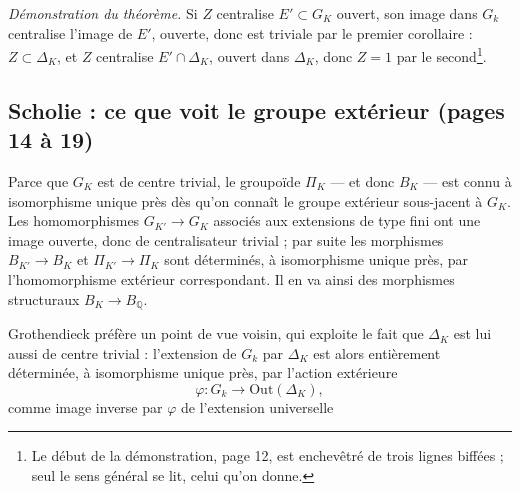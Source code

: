 \documentclass[11pt,a4paper]{article}
\begin{document}
\emph{Démonstration du théorème.} Si $Z$ centralise $E' \subset G_K$ ouvert,
son image dans $G_k$ centralise l'image de $E'$, ouverte, donc est triviale
par le premier corollaire : $Z \subset \Delta_K$, et $Z$ centralise $E' \cap
\Delta_K$, ouvert dans $\Delta_K$, donc $Z = 1$ par le second\footnote{Le
début de la démonstration, page 12, est enchevêtré de trois lignes biffées ;
seul le sens général se lit, celui qu'on donne.}.

\subsection*{Scholie : ce que voit le groupe extérieur (pages 14 à 19)}

Parce que $G_K$ est de centre trivial, le groupoïde $\Pi_K$ — et donc
$B_K$ — est connu à isomorphisme unique près dès qu'on connaît le groupe
extérieur sous-jacent à $G_K$. Les homomorphismes $G_{K'} \to G_K$ associés
aux extensions de type fini ont une image ouverte, donc de centralisateur
trivial ; par suite les morphismes $B_{K'} \to B_K$ et $\Pi_{K'} \to \Pi_K$
sont déterminés, à isomorphisme unique près, par l'homomorphisme extérieur
correspondant. Il en va ainsi des morphismes structuraux $B_K \to
B_{\mathbb{Q}}$.

Grothendieck préfère un point de vue voisin, qui exploite le fait que
$\Delta_K$ est lui aussi de centre trivial : l'extension de $G_k$ par
$\Delta_K$ est alors entièrement déterminée, à isomorphisme unique près, par
l'action extérieure
\[
\varphi : G_k \longrightarrow \mathrm{Out}(\Delta_K),
\]
comme image inverse par $\varphi$ de l'extension universelle

\end{document}
